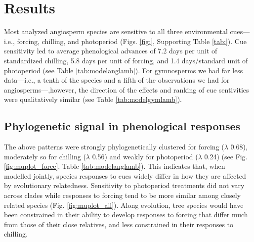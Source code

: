 \documentclass{article}\usepackage[]{graphicx}\usepackage[]{color}
\begin{document}





\section*{Results}
Most analyzed angiosperm species are sensitive to all three environmental cues---i.e., forcing, chilling, and photoperiod (Figs. \ref{fig:}, Supporting Table \ref{tab:}). Cue sensitivity led to average phenological advances of 7.2 days per unit of standardized chilling, 5.8 days per unit of forcing, and 1.4 days/standard unit of photoperiod (see Table \ref{tab:modelanglamb}). For gymnosperms we had far less data---i.e., a tenth of the species and a fifth of the observations we had for angiosperms---,however, the direction of the effects and ranking of cue sentivities were qualitatively similar (see Table \ref{tab:modelgymlamb}).\\ %



\subsection*{Phylogenetic signal in phenological responses}
The above patterns were strongly phylogenetically clustered for forcing ($\lambda$ \= 0.68), moderately so for chilling ($\lambda$ \= 0.56) and weakly for photoperiod ($\lambda$ \= 0.24) (see Fig. \ref{fig:muplot_force}, Table \ref{tab:modelanglamb}). This indicates that, when modelled jointly, species responses to cues widely differ in how they are affected by evolutionary relatedness. Sensitivity to photoperiod treatments did not vary across clades while responses to forcing tend to be more similar among closely related species (Fig. \ref{fig:muplot_all}). Along evolution, tree species would have been constrained %
in their ability to develop responses to forcing that differ much from those of their close relatives, and less constrained in their responses to chilling.\\
\end{document}
